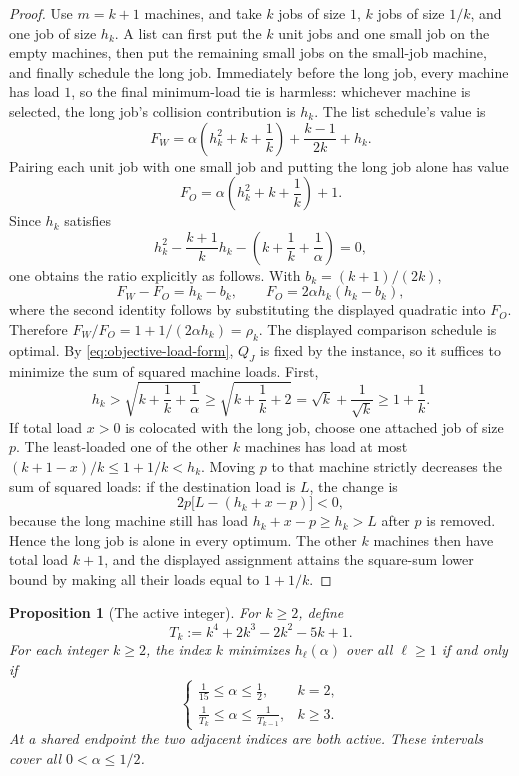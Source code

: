 \documentclass[11pt]{article}
\newtheorem{proposition}[theorem]{Proposition}
\theoremstyle{remark}
\begin{document}
\begin{proof}
Use $m=k+1$ machines, and take $k$ jobs of size
$1$, $k$ jobs of size $1/k$, and one job of size $h_k$.  A list can
first put the $k$ unit jobs and one small job on the empty machines,
then put the remaining small jobs on the small-job machine, and finally
schedule the long job.  Immediately before the long job, every machine
has load \(1\), so the final minimum-load tie is harmless: whichever
machine is selected, the long job's collision contribution is \(h_k\).
The list schedule's value is
\[
 F_W=\alpha\left(h_k^2+k+\frac1k\right)
       +\frac{k-1}{2k}+h_k.
\]
Pairing each unit job with one small job and putting the long job alone
has value
\[
 F_O=\alpha\left(h_k^2+k+\frac1k\right)+1.
\]
Since $h_k$ satisfies
\[
 h_k^2-\frac{k+1}{k}h_k
       -\left(k+\frac1k+\frac1\alpha\right)=0,
\]
one obtains the ratio explicitly as follows.  With
$b_k=(k+1)/(2k)$,
\[
 F_W-F_O=h_k-b_k,
 \qquad
 F_O=2\alpha h_k(h_k-b_k),
\]
where the second identity follows by substituting the displayed
quadratic into $F_O$.  Therefore
$F_W/F_O=1+1/(2\alpha h_k)=\rho_k$.
The displayed comparison schedule is optimal.  By
\eqref{eq:objective-load-form}, $Q_J$ is fixed by the instance, so it
suffices to minimize the sum of squared machine loads.  First,
\[
 h_k>\sqrt{k+\frac1k+\frac1\alpha}
 \geq\sqrt{k+\frac1k+2}
 =\sqrt{k}+\frac1{\sqrt{k}}\geq1+\frac1k.
\]
If total load \(x>0\) is colocated with the long job, choose one attached
job of size \(p\).  The least-loaded one of the other \(k\) machines has
load at most \((k+1-x)/k\leq1+1/k<h_k\).  Moving \(p\) to that machine
strictly decreases the sum of squared loads: if the destination load is
$L$, the change is
\[
 2p\bigl[L-(h_k+x-p)\bigr]<0,
\]
because the long machine still has load $h_k+x-p\geq h_k>L$ after
$p$ is removed.  Hence the long job is alone in every optimum.  The
other $k$ machines then have total load $k+1$, and the displayed
assignment attains the square-sum lower bound by making all their loads
equal to $1+1/k$.
\end{proof}

\begin{proposition}[The active integer]
\label{prop:active-index}
For $k\geq2$, define
\[
 T_k:=k^4+2k^3-2k^2-5k+1.
\]
For each integer $k\geq2$, the index $k$ minimizes $h_\ell(\alpha)$
over all $\ell\geq1$ if and only if
\[
 \begin{cases}
 \displaystyle \frac1{15}\leq\alpha\leq\frac12,
   & k=2,\\[6pt]
 \displaystyle \frac1{T_k}\leq\alpha\leq\frac1{T_{k-1}},
   & k\geq3.
 \end{cases}
\]
At a shared endpoint the two adjacent indices are both active.
These intervals cover all $0<\alpha\leq1/2$.
\end{proposition}
\end{document}
